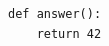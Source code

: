 \documentclass{article}
\begin{document}
\begin{verbatim}
def answer():
    return 42
\end{verbatim}
\end{document}
